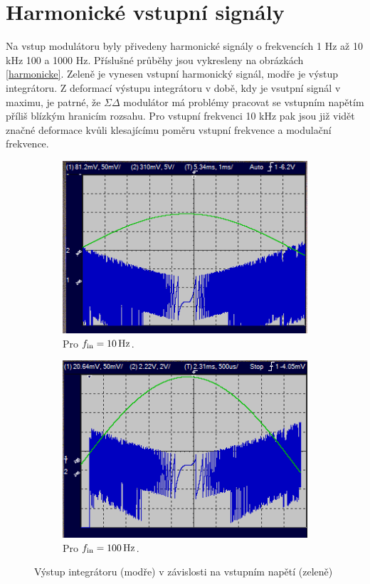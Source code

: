 \documentclass[twoside]{article}
\begin{document}
\section{Harmonické vstupní signály}

Na vstup modulátoru byly přivedeny harmonické signály o frekvencích
1 Hz až 10 kHz 100 a 1000 Hz. Příslušné průběhy jsou vykresleny
na obrázkách \ref{harmonicke}.
Zeleně je vynesen vstupní harmonický signál, modře je výstup integrátoru.
Z deformací výstupu integrátoru v době, kdy je vsutpní signál v maximu,
je patrné, že $\Sigma\Delta$ modulátor má problémy pracovat
se vstupním napětím příliš blízkým hranicím rozsahu.
Pro vstupní frekvenci 10 kHz pak jsou již vidět značné deformace
kvůli klesajícímu poměru vstupní frekvence a modulační frekvence.

\begin{figure}[h]
    \centering
    \begin{subfigure}{0.45\textwidth}
        \includegraphics[width=\textwidth]{sin-10Hz.png}
        \caption{Pro $f_{\rm in} = \SI{10}{\hertz}$.}
        \label{10Hz}
    \end{subfigure}
    \begin{subfigure}{0.45\textwidth}
        \includegraphics[width=\textwidth]{sin-100Hz.png}
    \caption{Pro $f_{\rm in} = \SI{100}{\hertz}$.}
    \label{100Hz}
    \end{subfigure}
    \caption{Výstup integrátoru (modře) v závislosti na
    vstupním napětí (zeleně)}


\end{figure}
\end{document}
